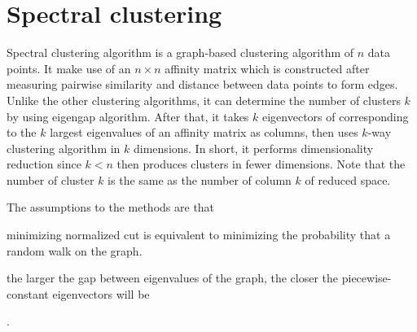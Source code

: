 \section{Spectral clustering}
\label{sec:spectralclustering}
Spectral clustering algorithm is a graph-based clustering algorithm of $n$ data points. 
It make use of an $n \times n$ affinity matrix which is constructed after measuring pairwise similarity and distance between data points to form edges. 
Unlike the other clustering algorithms, it can determine the number of clusters $k$ by using eigengap algorithm. 
After that, it takes $k$ eigenvectors of corresponding to the $k$ largest eigenvalues of an affinity matrix as columns, 
then uses $k$-way clustering algorithm in $k$ dimensions. 
In short, it performs dimensionality reduction since $k < n$ then produces clusters in fewer dimensions. 
Note that the number of cluster $k$ is the same as the number of column $k$ of reduced space. 

The assumptions to the methods are that \begin{inparaenum}[\itshape a\upshape)]
\item minimizing normalized cut is equivalent to minimizing the probability that a random walk on the graph.
\item the larger the gap between eigenvalues of the graph, %
the closer the piecewise-constant eigenvectors will be
\end{inparaenum}. \newline 


